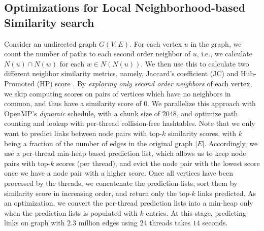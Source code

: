 




\subsection{Optimizations for Local Neighborhood-based Similarity search}
\label{sec:leiden}

Consider an undirected graph $G(V, E)$. For each vertex $u$ in the graph, we count the number of paths to each second order neighbor of $u$, i.e., we calculate $N(u) \cap N(w)$ for each $w \in N(N(u))$. We then use this to calculate two different neighbor similarity metrics, namely, Jaccard's coefficient (JC) and Hub-Promoted (HP) score \cite{gatadi2023lpcd}. By \textit{exploring only second order neighbors} of each vertex, we skip computing scores on pairs of vertices which have no neighbors in common, and thus have a similarity score of $0$. We parallelize this approach with OpenMP's \textit{dynamic} schedule, with a chunk size of $2048$, and optimize path counting and lookup with per-thread collision-free hashtables. Note that we only want to predict links between node pairs with top-$k$ similarity scores, with $k$ being a fraction of the number of edges in the original graph $|E|$. Accordingly, we use a per-thread min-heap based prediction list, which allows us to keep node pairs with top-$k$ scores (per thread), and evict the node pair with the lowest score once we have a node pair with a higher score. Once all vertices have been processed by the threads, we concatenate the prediction lists, sort them by similarity score in increasing order, and return only the top-$k$ links predicted. As an optimization, we convert the per-thread prediction lists into a min-heap only when the prediction lists is populated with $k$ entries. At this stage, predicting links on graph with $2.3$ million edges using $24$ threads takes $14$ seconds.

